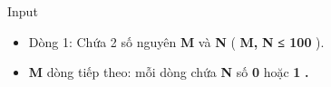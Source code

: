 Input   
\begin{itemize}
	\item     Dòng 1: Chứa 2 số nguyên    \textbf{     M    }    và    \textbf{     N    }    (    \textbf{     M,    }\textbf{     N    }\textbf{     ≤ 100    }    ).   
	\item \textbf{     M    }    dòng tiếp theo: mỗi dòng chứa    \textbf{     N    }    số    \textbf{     0    }    hoặc    \textbf{     1    }\textbf{     .    }
\end{itemize}